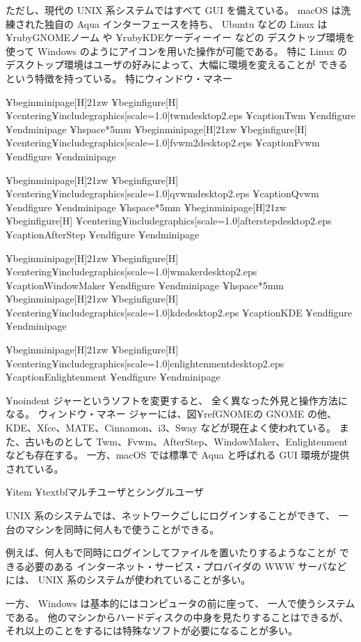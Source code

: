 ただし、現代の UNIX 系システムではすべて GUI を備えている。
macOS は洗練された独自の Aqua インターフェースを持ち、
Ubuntu などの Linux は ¥ruby{GNOME}{ノーム} や ¥ruby{KDE}{ケーディーイー} などの
デスクトップ環境を使って Windows のようにアイコンを用いた操作が可能である。
特に Linux のデスクトップ環境はユーザの好みによって、大幅に環境を変えることが
できるという特徴を持っている。
特にウィンドウ・マネー

¥begin{minipage}[H]{21zw}
¥begin{figure}[H]
¥centering{¥includegraphics[scale=1.0]{twmdesktop2.eps}}
¥caption{Twm}
¥end{figure}
¥end{minipage}
¥hspace*{5mm}
¥begin{minipage}[H]{21zw}
¥begin{figure}[H]
¥centering{¥includegraphics[scale=1.0]{fvwm2desktop2.eps}}
¥caption{Fvwm}
¥end{figure}
¥end{minipage}

¥begin{minipage}[H]{21zw}
¥begin{figure}[H]
¥centering{¥includegraphics[scale=1.0]{qvwmdesktop2.eps}}
¥caption{Qvwm}
¥end{figure}
¥end{minipage}
¥hspace*{5mm}
¥begin{minipage}[H]{21zw}
¥begin{figure}[H]
¥centering{¥includegraphics[scale=1.0]{afterstepdesktop2.eps}}
¥caption{AfterStep}
¥end{figure}
¥end{minipage}

¥begin{minipage}[H]{21zw}
¥begin{figure}[H]
¥centering{¥includegraphics[scale=1.0]{wmakerdesktop2.eps}}
¥caption{WindowMaker}
¥end{figure}
¥end{minipage}
¥hspace*{5mm}
¥begin{minipage}[H]{21zw}
¥begin{figure}[H]
¥centering{¥includegraphics[scale=1.0]{kdedesktop2.eps}}
¥caption{KDE}
¥end{figure}
¥end{minipage}

¥begin{minipage}[H]{21zw}
¥begin{figure}[H]
¥centering{¥includegraphics[scale=1.0]{enlightenmentdesktop2.eps}}
¥caption{Enlightenment}
¥end{figure}
¥end{minipage}

¥noindent
ジャーというソフトを変更すると、
全く異なった外見と操作方法になる。
ウィンドウ・マネー
ジャーには、図¥ref{GNOME}の GNOME の他、
KDE、Xfce、MATE、Cinnamon、i3、Sway などが現在よく使われている。
また、古いものとして Twm、Fvwm、AfterStep、WindowMaker、Enlightenment なども存在する。
一方、macOS では標準で Aqua と呼ばれる GUI 環境が提供されている。

¥item ¥textbf{マルチユーザとシングルユーザ}

UNIX 系のシステムでは、ネットワークごしにログインすることができて、
一台のマシンを同時に何人もで使うことができる。

例えば、何人もで同時にログインしてファイルを置いたりするようなことが
できる必要のある
インターネット・サービス・プロバイダの WWW サーバなどには、
 UNIX 系のシステムが使われていることが多い。

一方、 Windows は基本的にはコンピュータの前に座って、
一人で使うシステムである。
他のマシンからハードディスクの中身を見たりすることはできるが、
それ以上のことをするには特殊なソフトが必要になることが多い。

